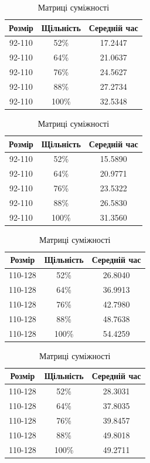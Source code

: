 \documentclass[12pt, letterpaper, twoside]{article}
\begin{document}
\begin{table}[htbp]
\begin{minipage}[b]{0.51\linewidth}
\begin{tabular}{|c|c|c|}
\hline
Розмір & Щільність & Середній час\\
\hline
92-110 & 52\% & 17.2447 \\
92-110 & 64\% & 21.0637 \\
92-110 & 76\% & 24.5627 \\
92-110 & 88\% & 27.2734 \\
92-110 & 100\% & 32.5348 \\
\hline
\end{tabular}
\caption{Списки суміжності}
\end{minipage}
\begin{minipage}[b]{0.51\linewidth}
\begin{tabular}{|c|c|c|}
\hline
Розмір & Щільність & Середній час\\
\hline
92-110 & 52\% & 15.5890 \\
92-110 & 64\% & 20.9771 \\
92-110 & 76\% & 23.5322 \\
92-110 & 88\% & 26.5830 \\
92-110 & 100\% & 31.3560 \\
\hline
\end{tabular}
\caption{Матриці суміжності}
\end{minipage}
\end{table}
\begin{table}[htbp]
\begin{minipage}[b]{0.51\linewidth}
\begin{tabular}{|c|c|c|}
\hline
Розмір & Щільність & Середній час\\
\hline
110-128 & 52\% & 26.8040 \\
110-128 & 64\% & 36.9913 \\
110-128 & 76\% & 42.7980 \\
110-128 & 88\% & 48.7638 \\
110-128 & 100\% & 54.4259 \\
\hline
\end{tabular}
\caption{Списки суміжності}
\end{minipage}
\begin{minipage}[b]{0.51\linewidth}
\begin{tabular}{|c|c|c|}
\hline
Розмір & Щільність & Середній час\\
\hline
110-128 & 52\% & 28.3031 \\
110-128 & 64\% & 37.8035 \\
110-128 & 76\% & 39.8457 \\
110-128 & 88\% & 49.8018 \\
110-128 & 100\% & 49.2711 \\
\hline
\end{tabular}
\caption{Матриці суміжності}
\end{minipage}
\end{table}
\end{document}
